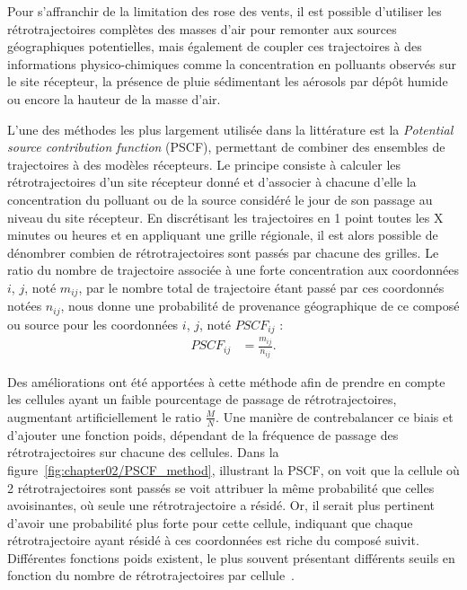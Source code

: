 Pour s'affranchir de la limitation des rose des vents, il est possible d'utiliser les
rétrotrajectoires complètes des masses d'air pour remonter aux sources géographiques
potentielles, mais également de coupler ces trajectoires à des informations
physico-chimiques comme la concentration en polluants observés sur le site récepteur, la
présence de pluie sédimentant les aérosols par dépôt humide ou encore la hauteur de la
masse d'air.

L'une des méthodes les plus largement utilisée dans la littérature est la \textit{Potential
source contribution function} (PSCF), permettant de combiner des ensembles de trajectoires à
des modèles récepteurs. Le principe consiste à calculer les rétrotrajectoires d'un site
récepteur donné et d'associer à chacune d'elle la concentration du polluant ou de la
source considéré le jour de son passage au niveau du site récepteur. En discrétisant les
trajectoires en 1 point toutes les X minutes ou heures et en appliquant une grille
régionale, il est alors possible de dénombrer combien de rétrotrajectoires sont passés par
chacune des grilles.  Le ratio du nombre de trajectoire associée à une forte concentration
aux coordonnées $i$, $j$, noté $m_{ij}$, par le nombre total de trajectoire étant passé
par ces coordonnés notées $n_{ij}$, nous donne une probabilité de provenance géographique
de ce composé ou source pour les coordonnées $i$, $j$, noté $PSCF_{ij}$ :
\begin{align}
    \label{eq:PSCF}
    PSCF_{ij} &= \frac{m_{ij}}{n_{ij}}.
\end{align}

Des améliorations ont été apportées à cette méthode afin de prendre en compte les cellules
ayant un faible pourcentage de passage de rétrotrajectoires, augmentant artificiellement
le ratio $\frac{M}{N}$. Une manière de contrebalancer ce biais et d'ajouter une fonction
poids, dépendant de la fréquence de passage des rétrotrajectoires sur chacune des
cellules. Dans la figure~\ref{fig:chapter02/PSCF_method}, illustrant la PSCF, on voit que
la cellule où 2 rétrotrajectoires sont passés se voit attribuer la même probabilité que
celles avoisinantes, où seule une rétrotrajectoire a résidé. Or, il serait plus pertinent
d'avoir une probabilité plus forte pour cette cellule, indiquant que chaque
rétrotrajectoire ayant résidé à ces coordonnées est riche du composé suivit.  Différentes
fonctions poids existent, le plus souvent présentant différents seuils en fonction du
nombre de rétrotrajectoires par cellule~\autocite{bressiSources2014,petitSources2019}.

